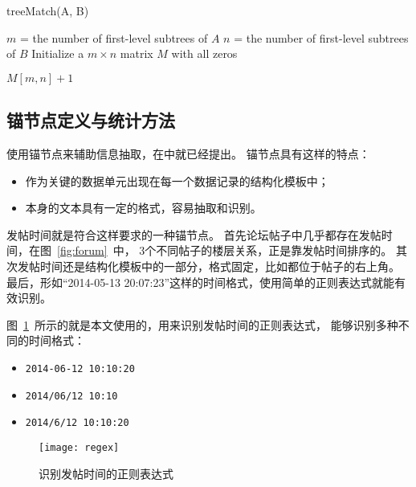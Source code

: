 \begin{algorithm}[htbp]
\caption{treeMatch(A, B)}
\label{algo:tree-match}

$m$ = the number of first-level subtrees of $A$ \;
$n$ = the number of first-level subtrees of $B$ \;
Initialize a $m \times n$ matrix $M$ with all zeros \;

\Return $M[m,n] + 1$ \;
\end{algorithm}

\subsection{锚节点定义与统计方法}
\label{subsec:anchor}

使用锚节点来辅助信息抽取，在\cite{song2010automatic}中就已经提出。
锚节点具有这样的特点：
\begin{itemize}
\item 作为关键的数据单元出现在每一个数据记录的结构化模板中；
\item 本身的文本具有一定的格式，容易抽取和识别。
\end{itemize}

发帖时间就是符合这样要求的一种锚节点。
首先论坛帖子中几乎都存在发帖时间，在图~\ref{fig:forum}~中，
3个不同帖子的楼层关系，正是靠发帖时间排序的。
其次发帖时间还是结构化模板中的一部分，格式固定，比如都位于帖子的右上角。
最后，形如“2014-05-13 20:07:23”这样的时间格式，使用简单的正则表达式就能有效识别。

图~\ref{fig:regex}~所示的就是本文使用的，用来识别发帖时间的正则表达式，
能够识别多种不同的时间格式：
\begin{itemize}
\item \texttt{2014-06-12 10:10:20}
\item \texttt{2014/06/12 10:10}
\item \texttt{2014/6/12 10:10:20}
\end{itemize}

\begin{figure}[htbp]
\centering
\texttt{[image: regex]}
\caption{识别发帖时间的正则表达式}
\label{fig:regex}
\end{figure}

